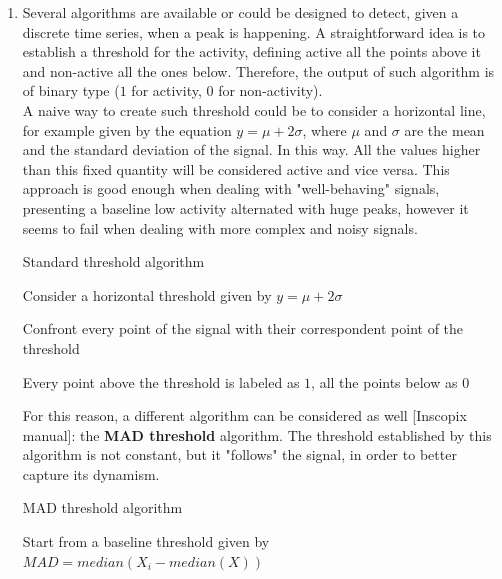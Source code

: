 \documentclass[a4paper]{article}
\begin{document}
\begin{enumerate}
	
	\item Several algorithms are available or could be designed to detect, given a discrete time series, when a peak is happening. A straightforward idea is to establish a threshold for the activity, defining active all the points above it and non-active  all the ones below. Therefore, the output of such algorithm is of binary type ($1$ for activity, $0$ for non-activity).\\
	
	A naive way to create such threshold could be to consider a horizontal line, for example given by the equation $ y = \mu + 2\sigma $,	where $\mu$ and $\sigma$ are the mean and the standard deviation of the signal. In this way. All the values higher than this fixed quantity will be considered active and vice versa. This approach is good enough when dealing with "well-behaving" signals, presenting a baseline low activity alternated with huge peaks, however it seems to fail when dealing with more complex and noisy signals.\\
		\begin{algorithm}
		\caption{Standard threshold algorithm}\label{tresh}
		\begin{algorithmic}[1]
			
			
			\State Consider a horizontal threshold given by $ y = \mu + 2\sigma $
			
			\State Confront every point of the signal with their correspondent point of the threshold
			
			\State Every point above the threshold is labeled as $1$, all the points below as $0$
		\end{algorithmic}
	\end{algorithm}


		For this reason, a different algorithm can be considered as well [Inscopix manual]: the \textbf{MAD threshold} algorithm. The threshold established by this algorithm is not constant, but it "follows" the signal, in order to better capture its dynamism. 
	
	
	

	


	\begin{algorithm}
		\caption{MAD threshold algorithm}\label{mad}
		\begin{algorithmic}[1]
			
			
			\State Start from a baseline threshold given by $ MAD = median(X_i - median(X))$
		

\end{algorithmic}
\end{algorithm}
\end{enumerate}
\end{document}
